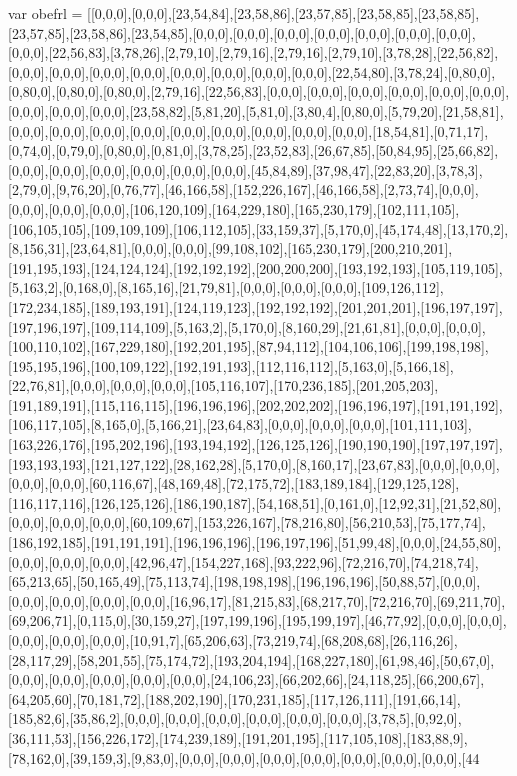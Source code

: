 var obefrl = [[0,0,0],[0,0,0],[23,54,84],[23,58,86],[23,57,85],[23,58,85],[23,58,85],[23,57,85],[23,58,86],[23,54,85],[0,0,0],[0,0,0],[0,0,0],[0,0,0],[0,0,0],[0,0,0],[0,0,0],[0,0,0],[22,56,83],[3,78,26],[2,79,10],[2,79,16],[2,79,16],[2,79,10],[3,78,28],[22,56,82],[0,0,0],[0,0,0],[0,0,0],[0,0,0],[0,0,0],[0,0,0],[0,0,0],[0,0,0],[22,54,80],[3,78,24],[0,80,0],[0,80,0],[0,80,0],[0,80,0],[2,79,16],[22,56,83],[0,0,0],[0,0,0],[0,0,0],[0,0,0],[0,0,0],[0,0,0],[0,0,0],[0,0,0],[0,0,0],[23,58,82],[5,81,20],[5,81,0],[3,80,4],[0,80,0],[5,79,20],[21,58,81],[0,0,0],[0,0,0],[0,0,0],[0,0,0],[0,0,0],[0,0,0],[0,0,0],[0,0,0],[0,0,0],[18,54,81],[0,71,17],[0,74,0],[0,79,0],[0,80,0],[0,81,0],[3,78,25],[23,52,83],[26,67,85],[50,84,95],[25,66,82],[0,0,0],[0,0,0],[0,0,0],[0,0,0],[0,0,0],[0,0,0],[45,84,89],[37,98,47],[22,83,20],[3,78,3],[2,79,0],[9,76,20],[0,76,77],[46,166,58],[152,226,167],[46,166,58],[2,73,74],[0,0,0],[0,0,0],[0,0,0],[0,0,0],[106,120,109],[164,229,180],[165,230,179],[102,111,105],[106,105,105],[109,109,109],[106,112,105],[33,159,37],[5,170,0],[45,174,48],[13,170,2],[8,156,31],[23,64,81],[0,0,0],[0,0,0],[99,108,102],[165,230,179],[200,210,201],[191,195,193],[124,124,124],[192,192,192],[200,200,200],[193,192,193],[105,119,105],[5,163,2],[0,168,0],[8,165,16],[21,79,81],[0,0,0],[0,0,0],[0,0,0],[109,126,112],[172,234,185],[189,193,191],[124,119,123],[192,192,192],[201,201,201],[196,197,197],[197,196,197],[109,114,109],[5,163,2],[5,170,0],[8,160,29],[21,61,81],[0,0,0],[0,0,0],[100,110,102],[167,229,180],[192,201,195],[87,94,112],[104,106,106],[199,198,198],[195,195,196],[100,109,122],[192,191,193],[112,116,112],[5,163,0],[5,166,18],[22,76,81],[0,0,0],[0,0,0],[0,0,0],[105,116,107],[170,236,185],[201,205,203],[191,189,191],[115,116,115],[196,196,196],[202,202,202],[196,196,197],[191,191,192],[106,117,105],[8,165,0],[5,166,21],[23,64,83],[0,0,0],[0,0,0],[0,0,0],[101,111,103],[163,226,176],[195,202,196],[193,194,192],[126,125,126],[190,190,190],[197,197,197],[193,193,193],[121,127,122],[28,162,28],[5,170,0],[8,160,17],[23,67,83],[0,0,0],[0,0,0],[0,0,0],[0,0,0],[60,116,67],[48,169,48],[72,175,72],[183,189,184],[129,125,128],[116,117,116],[126,125,126],[186,190,187],[54,168,51],[0,161,0],[12,92,31],[21,52,80],[0,0,0],[0,0,0],[0,0,0],[60,109,67],[153,226,167],[78,216,80],[56,210,53],[75,177,74],[186,192,185],[191,191,191],[196,196,196],[196,197,196],[51,99,48],[0,0,0],[24,55,80],[0,0,0],[0,0,0],[0,0,0],[42,96,47],[154,227,168],[93,222,96],[72,216,70],[74,218,74],[65,213,65],[50,165,49],[75,113,74],[198,198,198],[196,196,196],[50,88,57],[0,0,0],[0,0,0],[0,0,0],[0,0,0],[0,0,0],[16,96,17],[81,215,83],[68,217,70],[72,216,70],[69,211,70],[69,206,71],[0,115,0],[30,159,27],[197,199,196],[195,199,197],[46,77,92],[0,0,0],[0,0,0],[0,0,0],[0,0,0],[0,0,0],[10,91,7],[65,206,63],[73,219,74],[68,208,68],[26,116,26],[28,117,29],[58,201,55],[75,174,72],[193,204,194],[168,227,180],[61,98,46],[50,67,0],[0,0,0],[0,0,0],[0,0,0],[0,0,0],[0,0,0],[24,106,23],[66,202,66],[24,118,25],[66,200,67],[64,205,60],[70,181,72],[188,202,190],[170,231,185],[117,126,111],[191,66,14],[185,82,6],[35,86,2],[0,0,0],[0,0,0],[0,0,0],[0,0,0],[0,0,0],[0,0,0],[3,78,5],[0,92,0],[36,111,53],[156,226,172],[174,239,189],[191,201,195],[117,105,108],[183,88,9],[78,162,0],[39,159,3],[9,83,0],[0,0,0],[0,0,0],[0,0,0],[0,0,0],[0,0,0],[0,0,0],[0,0,0],[44